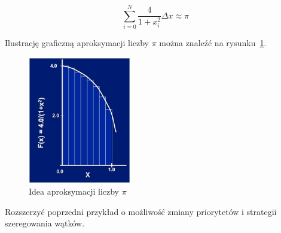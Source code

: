 \begin{myenumerate}
\begin{equation}\nonumber 
\sum_{i=0}^N\frac{4}{1+x_i^2}\Delta x\approx\pi
\end{equation}

Ilustrację graficzną aproksymacji liczby $\pi$ można znaleźć na rysunku~\ref{fig:piApprox}. 

\begin{figure}[!h]
\centering
\includegraphics[width=0.4\textwidth]{img/piApprox}
\caption{Idea aproksymacji liczby $\pi$}
\label{fig:piApprox}
\end{figure}



\item Rozszerzyć poprzedni przykład o możliwość zmiany priorytetów i strategii szeregowania wątków.
\end{myenumerate} 


\cleardoublepage
